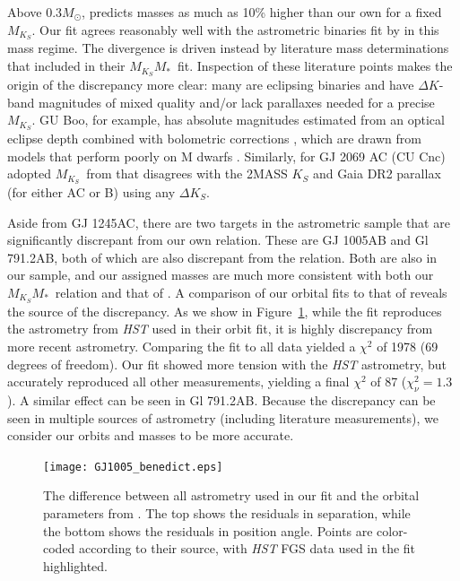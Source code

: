 \documentclass[twocolumn]{aastex62}
\newcommand{\mks}{$M_{K_S}$}
\newcommand{\mmk}{$M_{K_S}$\textendash$M_*$}
\begin{document}
 Above 0.3$M_\odot$, \citet{Benedict2016} predicts masses as much as 10\% higher than our own for a fixed \mks. Our fit agrees reasonably well with the astrometric binaries fit by \citet{Benedict2016} in this mass regime. The divergence is driven instead by literature mass determinations that \citet{Benedict2016} included in their \mmk\ fit. Inspection of these literature points makes the origin of the discrepancy more clear: many are eclipsing binaries and have $\Delta K$-band magnitudes of mixed quality and/or lack parallaxes needed for a precise \mks. GU Boo, for example, has absolute magnitudes estimated from an optical eclipse depth combined with bolometric corrections \citep{Lopez2005}, which are drawn from models that perform poorly on M dwarfs \citep{1998A&AS..130...65L,Hauschildt1999}. Similarly, for GJ 2069 AC (CU Cnc) \citet{Benedict2016} adopted \mks\ from \citet{Ribas2003} that disagrees with the 2MASS $K_S$ and Gaia DR2 parallax (for either AC or B) using any $\Delta K_S$. 
 
 Aside from GJ 1245AC, there are two targets in the \citet{Benedict2016} astrometric sample that are significantly discrepant from our own relation. These are GJ 1005AB and Gl 791.2AB, both of which are also discrepant from the \citet{Benedict2016} relation. Both are also in our sample, and our assigned masses are much more consistent with both our \mmk\ relation and that of \citet{Benedict2016}.  A comparison of our orbital fits to that of \citet{Benedict2016} reveals the source of the discrepancy. As we show in Figure~\ref{fig:gj1005}, while the \citet{Benedict2016} fit reproduces the astrometry from {\it HST} used in their orbit fit, it is highly discrepancy from more recent astrometry.  Comparing the \citet{Benedict2016} fit to all data yielded a $\chi^2$ of 1978 (69 degrees of freedom). Our fit showed more tension with the {\it HST} astrometry, but accurately reproduced all other measurements, yielding a final $\chi^2$ of 87 ($\chi^2_\nu=1.3$). A similar effect can be seen in Gl 791.2AB. Because the discrepancy can be seen in multiple sources of astrometry (including literature measurements), we consider our orbits and masses to be more accurate. 
 
 \begin{figure}[htb]
\begin{center}
\texttt{[image: GJ1005\_benedict.eps]}
\caption{The difference between all astrometry used in our fit and the orbital parameters from \citet{Benedict2016}. The top shows the residuals in separation, while the bottom shows the residuals in position angle. Points are color-coded according to their source, with {\it HST} FGS data used in the \citet{Benedict2016} fit highlighted. }
\label{fig:gj1005}
\end{center}
\end{figure}
\end{document}
